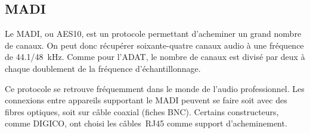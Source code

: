 \documentclass[
]{book}
\begin{document}
\hypertarget{madi}{%
\subsection{MADI}\label{madi}}

Le MADI, ou AES10, est un protocole permettant d'acheminer un grand nombre de canaux. On peut donc récupérer soixante-quatre canaux audio à une fréquence de 44.1/48~kHz. Comme pour l'ADAT, le nombre de canaux est divisé par deux à chaque doublement de la fréquence d'échantillonnage.

Ce protocole se retrouve fréquemment dans le monde de l'audio professionnel. Les connexions entre appareils supportant le MADI peuvent se faire soit avec des fibres optiques, soit sur câble coaxial (fiches BNC). Certains constructeurs, comme DIGICO, ont choisi les câbles~RJ45 comme support d'acheminement.
\end{document}
